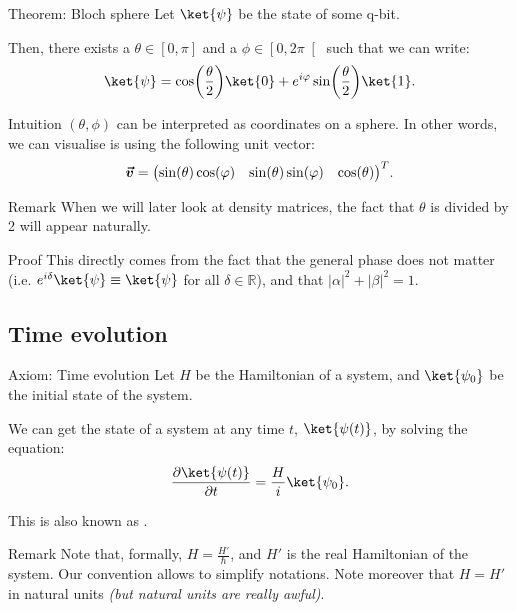 \documentclass[a4paper]{article}
\begin{document}
\begin{parag}{Theorem: Bloch sphere}
    Let $\ket{\psi}$ be the state of some q-bit.

    Then, there exists a $\theta \in \left[0, \pi\right]$ and a $\phi \in \left[0, 2\pi\right[ $ such that we can write: 
    \[\ket{\psi} = \cos\left(\frac{\theta}{2}\right)\ket{0} + e^{i\phi} \sin\left(\frac{\theta}{2}\right) \ket{1}.\]

    \begin{subparag}{Intuition}
        $\left(\theta, \phi\right)$ can be interpreted as coordinates on a sphere. In other words, we can visualise is using the following unit vector: 
        \[\bvec{v} = \begin{pmatrix} \sin\left(\theta\right)\cos\left(\phi\right) & \sin\left(\theta\right)\sin\left(\phi\right) & \cos\left(\theta\right) \end{pmatrix}^T.\]
    \end{subparag}

    \begin{subparag}{Remark}
        When we will later look at density matrices, the fact that $\theta$ is divided by 2 will appear naturally.
    \end{subparag}

    \begin{subparag}{Proof}
        This directly comes from the fact that the general phase does not matter (i.e. $e^{i \delta} \ket{\psi} \equiv \ket{\psi}$ for all $\delta \in \mathbb{R}$), and that $\left|\alpha\right|^2 + \left|\beta\right|^2 = 1$.
    \end{subparag}
\end{parag}

\subsection{Time evolution}
\begin{parag}{Axiom: Time evolution}
    Let $H$ be the Hamiltonian of a system, and $\ket{\psi_0}$ be the initial state of the system.

    We can get the state of a system at any time $t$, $\ket{\psi\left(t\right)}$, by solving the equation: 
    \[\frac{\partial \ket{\psi\left(t\right)}}{\partial t} = \frac{H}{i} \ket{\psi_0}.\]

    This is also known as .

    \begin{subparag}{Remark}
        Note that, formally, $H = \frac{H'}{\hbar}$, and $H'$ is the real Hamiltonian of the system. Our convention allows to simplify notations. Note moreover that $H = H'$ in natural units \textit{(but natural units are really awful)}.
    \end{subparag}
\end{parag}
\end{document}
